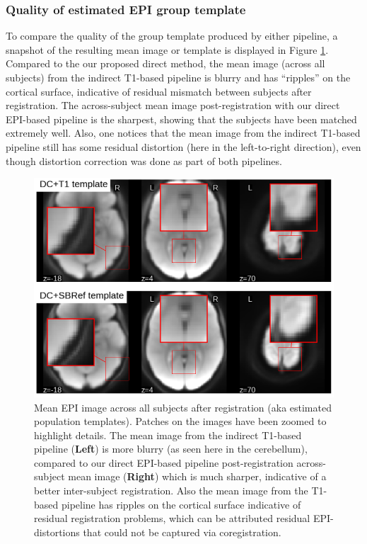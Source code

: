 \subsubsection{Quality of estimated EPI group template}
To compare the quality of the group template produced by either pipeline, a snapshot of the resulting mean image or template is displayed in
Figure \ref{fig:template}. Compared to the our proposed direct method,
the mean image (across all subjects) from the indirect T1-based
pipeline is blurry and has ``ripples'' on the cortical surface,
indicative of residual mismatch between subjects after
registration. The across-subject mean image post-registration with our
direct EPI-based pipeline is the sharpest, showing that the subjects
have been matched extremely well. Also, one notices that the mean image from
the indirect T1-based pipeline still has some residual distortion (here in the
left-to-right direction), even though distortion correction was done as part of both pipelines.

\begin{figure}[!htbp]
  \includegraphics[width=1\linewidth]{figures/template.png}
\caption{Mean EPI image
  across all subjects after registration (aka estimated population
  templates). Patches on the images have been zoomed to highlight
  details. The mean image from the indirect T1-based
  pipeline (\textbf{Left}) is more blurry (as seen here in the
  cerebellum), compared to
  our direct EPI-based pipeline post-registration across-subject mean
  image (\textbf{Right}) which is much sharper, indicative of a
  better inter-subject
  registration. Also the mean image from the T1-based pipeline has
  ripples on the cortical surface indicative of residual registration
  problems, which can be attributed residual EPI-distortions that
  could not be captured via coregistration.}
\label{fig:template}
\end{figure}



